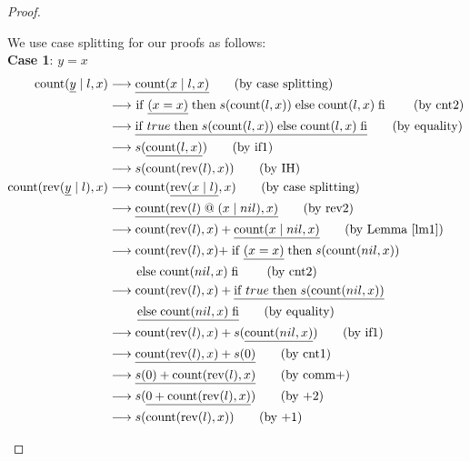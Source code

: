 \documentclass[12pt, a4paper]{article}
\newcommand{\rel}[1]{\mathrel{#1}}
\newcommand{\rmx}[1]{\mathrm{#1}}
\newcommand{\larrow}{\longrightarrow}
\newcommand{\under}{\underline}
\begin{document}
\begin{proof}
\begin{description}
We use case splitting for our proofs as follows: \\
\textbf{Case 1}: $y = x$
\begin{align*}
\rmx{count}(\under{y} \mid l, x)
	&\larrow \under{\rmx{count}(x \mid l, x)} \tag{by case splitting} \\
	&\larrow\ \rel{\rmx{if}} \under{(x = x)} \rel{\rmx{then}} s(\rmx{count}(l, x)) \rel{\rmx{else}} \rmx{count}(l, x) \rel{\rmx{fi}} \tag{by cnt2} \\
	&\larrow \under{\rel{\rmx{if}} true \rel{\rmx{then}} s(\rmx{count}(l, x)) \rel{\rmx{else}} \rmx{count}(l, x) \rel{\rmx{fi}}} \tag{by equality} \\
	&\larrow s(\under{\rmx{count}(l, x)}) \tag{by if1} \\
	&\larrow s(\rmx{count}(\rmx{rev}(l), x)) \tag{by IH} \\
\rmx{count}(\rmx{rev}(\under{y} \mid l), x)
	&\larrow \rmx{count}(\under{\rmx{rev}(x \mid l)}, x) \tag{by case splitting} \\
	&\larrow \under{\rmx{count}(\rmx{rev}(l) \rel{@} (x \mid nil), x)} \tag{by rev2} \\
	&\larrow \rmx{count}(\rmx{rev}(l), x) + \under{\rmx{count}(x \mid nil, x)} \tag{by Lemma~\ref{lm1}} \\
	&\larrow \rmx{count}(\rmx{rev}(l), x) + \rel{\rmx{if}} \under{(x = x)} \rel{\rmx{then}} s(\rmx{count}(nil,x)) \\
	&\quad \quad \rel{\rmx{else}} \rmx{count}(nil,x) \rel{\rmx{fi}} \tag{by cnt2} \\
	&\larrow \rmx{count}(\rmx{rev}(l), x) + \under{\rel{\rmx{if}} true \rel{\rmx{then}} s(\rmx{count}(nil,x))} \\
	&\quad \quad\ \under{\rel{\rmx{else}} \rmx{count}(nil,x) \rel{\rmx{fi}}} \tag{by equality} \\
	&\larrow \rmx{count}(\rmx{rev}(l), x) + s(\under{\rmx{count}(nil,x)}) \tag{by if1} \\
	&\larrow \under{\rmx{count}(\rmx{rev}(l), x) + s(0)} \tag{by cnt1} \\
	&\larrow \under{s(0) + \rmx{count}(\rmx{rev}(l), x)} \tag{by comm+} \\
	&\larrow s(\under{0 + \rmx{count}(\rmx{rev}(l), x)}) \tag{by +2} \\
	&\larrow s(\rmx{count}(\rmx{rev}(l), x)) \tag{by +1}
\end{align*}


\end{description}
\end{proof}
\end{document}

